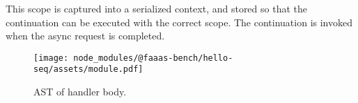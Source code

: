 This scope is captured into a serialized context, and stored so that the continuation can be executed with the correct scope. The continuation is invoked when the async request is completed.

\begin{figure}[t]
    \texttt{[image: node\_modules/@faaas-bench/hello-seq/assets/module.pdf]}
    \caption{AST of handler body.}
    \label{fig:suites-hello-seq-module-ast}
\end{figure}
